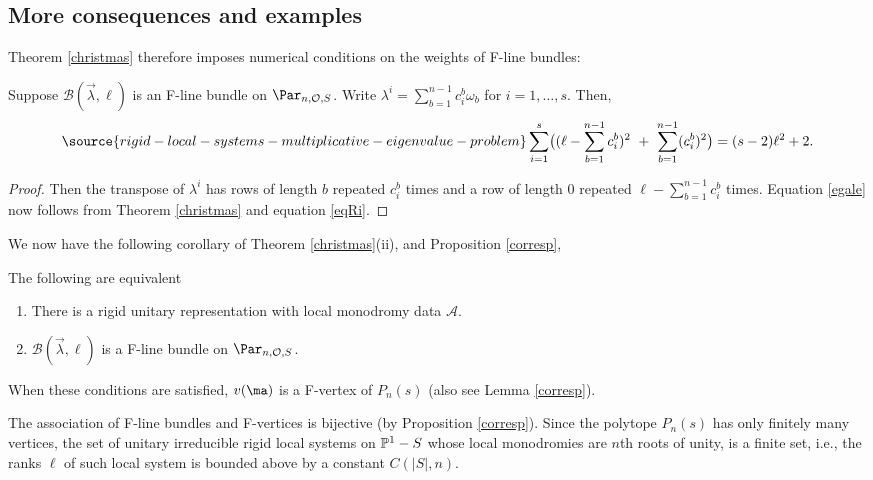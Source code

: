\subsection{More consequences and examples}
Theorem \ref{christmas} therefore imposes numerical conditions on the weights of F-line bundles:
\begin{corollary}
\notready\label{katzkatz}
Suppose $\mathcal{B}(\vec{\lambda},\ell)$ is an F-line bundle on $\Par_{n,\mathcal{O},S}$. Write $\lambda^i=\sum_{b=1}^{n-1}c^b_i\omega_b$ for $i=1,\dots,s$. Then,
\begin{equation}\label{egale}
\source{rigid-local-systems-multiplicative-eigenvalue-problem}
\sum_{i=1}^s \bigl((\ell-\sum_{b=1}^{n-1} c^b_i)^2 \ + \ \sum_{b=1}^{n-1}(c^b_i)^2\bigr) =(s-2)\ell^2+2.
\end{equation}
\end{corollary}
\begin{proof}
Then the transpose of $\lambda^i$ has rows of length $b$ repeated $c^b_i$ times and a row of length $0$ repeated $\ell-\sum_{b=1}^{n-1} c^b_i$ times. Equation \eqref{egale} now follows from Theorem \ref{christmas} and equation \eqref{eqRi}.
\end{proof}










\iffalse

We now have the following corollary of Theorem \ref{christmas}(ii), and Proposition \ref{corresp},
\begin{corollary}
\notready\label{bounded}
The following are equivalent
\begin{enumerate}
\item There is a rigid unitary representation with  local monodromy data $\mathcal{A}$.
\item $\mathcal{B}(\vec{\lambda},\ell)$ is a F-line bundle on $\Par_{n,{\mathcal{O}},S}$.
\end{enumerate}
When these conditions are satisfied, $v(\ma)$ is a F-vertex of $P_n(s)$ (also see Lemma \ref{corresp}).

The association of F-line bundles and F-vertices is bijective (by Proposition \ref{corresp}). Since the polytope $P_n(s)$ has only finitely many vertices, the set of  unitary irreducible rigid local systems on $\Bbb{P}^1-S$ whose local monodromies are $n$th
roots of unity, is a finite set, i.e., the ranks $\ell$ of such local system is bounded above by a constant $C(|S|,n)$.
\end{corollary}

